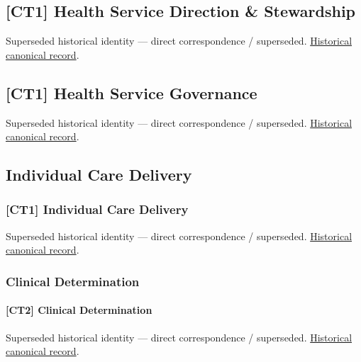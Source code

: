\subsection{[CT1] Health Service Direction \& Stewardship}

\par\label{element:360bf50f92484448a01cc57f2dbce23c}
Superseded historical identity — direct correspondence / superseded. \href{../../../../continuum/strategy/capability/360bf50f92484448a01cc57f2dbce23c.md}{Historical canonical record}.\par

\subsection{[CT1] Health Service Governance}

\par\label{element:24f3dd30223142efa35a5826552d53ab}
Superseded historical identity — direct correspondence / superseded. \href{../../../../continuum/strategy/capability/24f3dd30223142efa35a5826552d53ab.md}{Historical canonical record}.\par

\subsection{Individual Care Delivery}

\subsubsection{[CT1] Individual Care Delivery}

\par\label{element:162deb7e292042f78f677a14476a3a1d}
Superseded historical identity — direct correspondence / superseded. \href{../../../../continuum/strategy/capability/162deb7e292042f78f677a14476a3a1d.md}{Historical canonical record}.\par

\subsubsection{Clinical Determination}

\paragraph{[CT2] Clinical Determination}

\par\label{element:018ccd818ec142fba1ffb086d900acc6}
Superseded historical identity — direct correspondence / superseded. \href{../../../../continuum/strategy/capability/018ccd818ec142fba1ffb086d900acc6.md}{Historical canonical record}.\par


